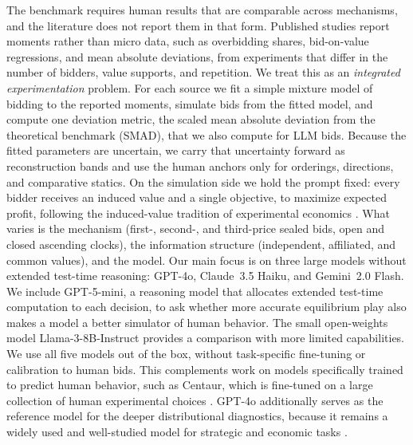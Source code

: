 \documentclass{article} %
\newif\ifmarkrev
\newcommand{\rev}[1]{\ifmarkrev\begingroup\color{red}#1\endgroup\else#1\fi}
\begin{document}
\rev{The benchmark requires human results that are comparable across mechanisms, and the literature does not report them in that form.
Published studies report moments rather than micro data, such as overbidding shares, bid-on-value regressions, and mean absolute deviations, from experiments that differ in the number of bidders, value supports, and repetition.
We treat this as an \emph{integrated experimentation} problem.
For each source we fit a simple mixture model of bidding to the reported moments, simulate bids from the fitted model, and compute one deviation metric, the scaled mean absolute deviation from the theoretical benchmark (SMAD), that we also compute for LLM bids.
Because the fitted parameters are uncertain, we carry that uncertainty forward as reconstruction bands and use the human anchors only for orderings, directions, and comparative statics.
On the simulation side we hold the prompt fixed: every bidder receives an induced value and a single objective, to maximize expected profit, following the induced-value tradition of experimental economics \citep{smith1976experimental}.
What varies is the mechanism (first-, second-, and third-price sealed bids, open and closed ascending clocks), the information structure (independent, affiliated, and common values), and the model.
Our main focus is on three large models without extended test-time reasoning: GPT-4o, Claude~3.5 Haiku, and Gemini~2.0 Flash. We include GPT-5-mini, a reasoning model that allocates extended test-time computation to each decision, to ask whether more accurate equilibrium play also makes a model a better simulator of human behavior. The small open-weights model Llama-3-8B-Instruct provides a comparison with more limited capabilities.
We use all five models out of the box, without task-specific fine-tuning or calibration to human bids. This complements work on models specifically trained to predict human behavior, such as Centaur, which is fine-tuned on a large collection of human experimental choices \citep{binz2025foundation}.
GPT-4o additionally serves as the reference model for the deeper distributional diagnostics, because it remains a widely used and well-studied model for strategic and economic tasks \citep{horton2023large, manning2024automated}.}
\end{document}
